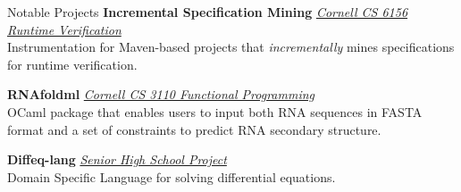  
\begin{rSection}{Notable Projects}
	\textbf{Incremental Specification Mining} \href{https://github.com/zwt299/spec-miners}{\textit{Cornell CS 6156 Runtime Verification} \ExternalLink} \\
	Instrumentation for Maven-based projects that \textit{incrementally} mines specifications for runtime verification.

	\textbf{RNAfoldml} \href{https://github.com/jpVinnie/RNAfoldml/}{\textit{Cornell CS 3110 Functional Programming} \ExternalLink} \\
	OCaml package that enables users to input both RNA sequences in FASTA format and a set of constraints to predict RNA secondary structure.

	\textbf{Diffeq-lang} \href{https://github.com/jpVinnie/diffeq-lang/}{\textit{Senior High School Project} \ExternalLink} \\
	Domain Specific Language for solving differential equations.

\end{rSection}